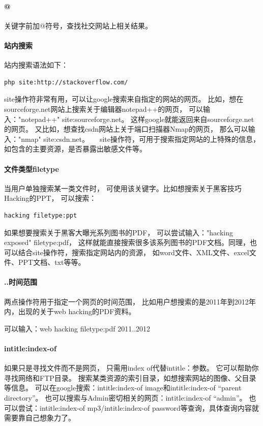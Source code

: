 \documentclass{book}
\begin{document}
\paragraph{@}关键字前加@符号，查找社交网站上相关结果。

\paragraph{站内搜索}站内搜索语法如下：

\begin{lstlisting}
php site:http://stackoverflow.com/
\end{lstlisting}

site操作符非常有用，可以让google搜索来自指定的网站的网页。
比如，想在sourceforge.net网站上搜索关于编辑器notepad++的网页，
可以输入："notepad++"  site:sourceforge.net。
这样google就能返回来自sourceforge.net的网页。
又比如，想查找csdn网站上关于端口扫描器Nmap的网页，
那么可以输入："nmap"  site:csdn.net。　　site操作符，可用于搜索指定网站的上特殊的信息，
如包含的主要资源，是否暴露出敏感文件等。

\paragraph{文件类型filetype}当用户单独搜索某一类文件时，
可使用该关键字。比如想搜索关于黑客技巧Hacking的PPT，
可以搜索：

\begin{lstlisting}
hacking filetype:ppt
\end{lstlisting}

如果想要搜索关于黑客大曝光系列图书的PDF，
可以尝试输入："hacking exposed" filetype:pdf，
这样就能直接搜索很多该系列图书的PDF文档。同理，也可以结合site操作符，搜索指定网站内的资源，
如word文件、XML文件、excel文件、PPT文档、txt等等。

\paragraph{..时间范围}
两点操作符用于指定一个网页的时间范围，
比如用户想搜索的是2011年到2012年内，出现的关于web hacking的PDF资料。

可以输入：web hacking filetype:pdf 2011..2012

\paragraph{intitle:index-of}
如果只是寻找文件而不是网页，
只需用index of代替intitle：参数。
它可以帮助你寻找网络和FTP目录。
搜索某类资源的索引目录，如想搜索网站的图像、父目录等信息。
可以在google搜索：intitle:index-of image和intitle:index-of “parent directory”。
也可以搜索与Admin密切相关的网页：intitle:index-of “admin”。 
也可以尝试：intitle:index-of mp3/intitle:index-of password等查询，具体查询内容就需要靠自己想象力了。
\end{document}
